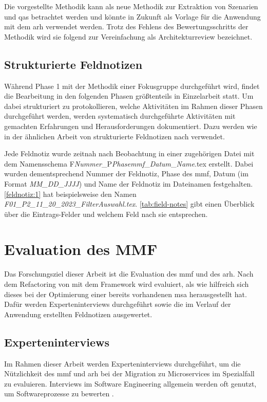 Die vorgestellte Methodik kann als neue Methodik zur Extraktion von Szenarien und \glspl{qa} betrachtet werden und könnte in Zukunft als Vorlage für die Anwendung mit dem \gls{arh} verwendet werden.
Trotz des Fehlens des Bewertungsschritts der Methodik wird sie folgend zur Vereinfachung als Architekturreview bezeichnet.

\subsection{Strukturierte Feldnotizen}
\label{sec:structured-field-notes}
Während Phase 1 mit der Methodik einer Fokusgruppe durchgeführt wird, findet die Bearbeitung in den fol\-gen\-den Phasen größtenteils in Einzelarbeit statt.
Um dabei strukturiert zu protokollieren, welche Aktivitäten im Rahmen dieser Phasen durchgeführt werden, werden systematisch durch\-ge\-führte Aktivitäten mit gemachten Erfahrungen und Herausforderungen dokumentiert. %
Dazu werden wie in der ähnlichen Arbeit von  strukturierte Feldnotizen nach  verwendet.

Jede Feldnotiz wurde zeitnah nach Beobachtung in einer zugehörigen Datei mit dem Na\-mens\-sche\-ma F\emph{Nummer}\_P\emph{Phase\gls{mmf}}\_\emph{Datum}\_\emph{Name}.tex erstellt.
Dabei wurden dementsprechend Nummer der Feldnotiz, Phase des \gls{mmf}, Datum (im Format \emph{MM\_DD\_JJJJ}) und Name der Feldnotiz im Dateinamen festgehalten.
\cref{feldnotiz:1} hat beispielsweise den Namen \emph{F01\_P2\_11\_20\_2023\_FilterAuswahl.tex}.
\cref{tab:field-notes} gibt einen Überblick über die Eintrags-Felder und welchem Feld nach  sie entsprechen.



\section{Evaluation des MMF}

Das Forschungsziel dieser Arbeit ist die Evaluation des \gls{mmf} und des \gls{arh}.
Nach dem Refactoring von \jf mit dem Framework wird evaluiert, als wie hilfreich sich dieses bei der Optimierung einer bereits vorhandenen \gls{msa} herausgestellt hat.
Dafür werden Experteninterviews durchgeführt sowie die im Verlauf der Anwendung erstellten Feldnotizen ausgewertet.

\subsection{Experteninterviews}
\label{sec:methodik-interviews}
Im Rahmen dieser Arbeit werden Experteninterviews durchgeführt, um die Nützlichkeit des \gls{mmf} und \gls{arh} bei der Migration zu Microservices im Spezialfall \jf zu evaluieren.
Interviews im Software Engineering allgemein werden oft genutzt, um Softwareprozesse zu bewerten \cite{seaman2008qualitative}.

